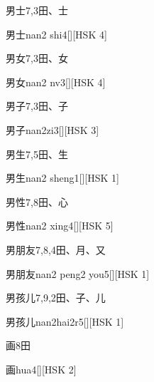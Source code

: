 \begin{entry}{男士}{7,3}{⽥、⼠}
  \begin{phonetics}{男士}{nan2 shi4}[][HSK 4]
  \end{phonetics}
\end{entry}

\begin{entry}{男女}{7,3}{⽥、⼥}
  \begin{phonetics}{男女}{nan2 nv3}[][HSK 4]
  \end{phonetics}
\end{entry}

\begin{entry}{男子}{7,3}{⽥、⼦}
  \begin{phonetics}{男子}{nan2zi3}[][HSK 3]
  \end{phonetics}
\end{entry}

\begin{entry}{男生}{7,5}{⽥、⽣}
  \begin{phonetics}{男生}{nan2 sheng1}[][HSK 1]
  \end{phonetics}
\end{entry}

\begin{entry}{男性}{7,8}{⽥、⼼}
  \begin{phonetics}{男性}{nan2 xing4}[][HSK 5]
  \end{phonetics}
\end{entry}

\begin{entry}{男朋友}{7,8,4}{⽥、⽉、⼜}
  \begin{phonetics}{男朋友}{nan2 peng2 you5}[][HSK 1]
  \end{phonetics}
\end{entry}

\begin{entry}{男孩儿}{7,9,2}{⽥、⼦、⼉}
  \begin{phonetics}{男孩儿}{nan2hai2r5}[][HSK 1]
  \end{phonetics}
\end{entry}

\begin{entry}{画}{8}{⽥}
  \begin{phonetics}{画}{hua4}[][HSK 2]
  \end{phonetics}
\end{entry}

